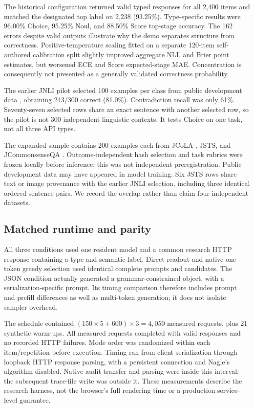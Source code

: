 \documentclass[11pt]{article}
\begin{document}
The historical configuration returned valid typed responses for all 2,400 items and matched the designated top label on 2,238 (93.25\%). Type-specific results were 96.00\% Choice, 95.25\% Noul, and 88.50\% Score top-stage accuracy. The 162 errors despite valid outputs illustrate why the demo separates structure from correctness. Positive-temperature scaling fitted on a separate 120-item self-authored calibration split slightly improved aggregate NLL and Brier point estimates, but worsened ECE and Score expected-stage MAE. Concentration is consequently not presented as a generally validated correctness probability.

The earlier JNLI pilot selected 100 examples per class from public development data \citep{kurihara2022jglue}, obtaining 243/300 correct (81.0\%). Contradiction recall was only 61\%. Seventy-seven selected rows share an exact sentence with another selected row, so the pilot is not 300 independent linguistic contexts. It tests Choice on one task, not all three API types.

The expanded sample contains 200 examples each from JCoLA \citep{someya2024jcola}, JSTS, and JCommonsenseQA \citep{kurihara2022jglue}. Outcome-independent hash selection and task rubrics were frozen locally before inference; this was not independent preregistration. Public development data may have appeared in model training. Six JSTS rows share text or image provenance with the earlier JNLI selection, including three identical ordered sentence pairs. We record the overlap rather than claim four independent datasets.

\subsection{Matched runtime and parity}
All three conditions used one resident model and a common research HTTP response containing a type and semantic label. Direct readout and native one-token greedy selection used identical complete prompts and candidates. The JSON condition actually generated a grammar-constrained object, with a serialization-specific prompt. Its timing comparison therefore includes prompt and prefill differences as well as multi-token generation; it does not isolate sampler overhead.

The schedule contained $(150\times5+600)\times3=4{,}050$ measured requests, plus 21 synthetic warm-ups. All measured requests completed with valid responses and no recorded HTTP failures. Mode order was randomized within each item/repetition before execution. Timing ran from client serialization through loopback HTTP response parsing, with a persistent connection and Nagle's algorithm disabled. Native audit transfer and parsing were inside this interval; the subsequent trace-file write was outside it. These measurements describe the research harness, not the browser's full rendering time or a production service-level guarantee.
\end{document}
